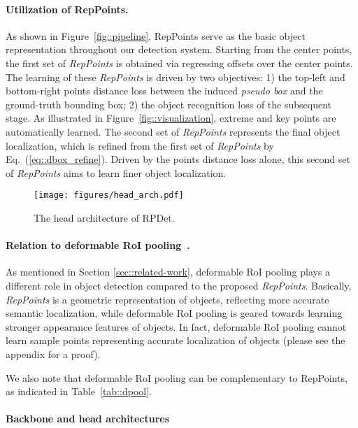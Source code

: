 \documentclass[10pt,twocolumn,letterpaper]{article}
\begin{document}
\paragraph{Utilization of RepPoints.} As shown in Figure~\ref{fig::pipeline}, RepPoints serve as the basic object representation throughout our detection system. Starting from the center points, the first set of \textit{RepPoints} is obtained via regressing offsets over the center points. The learning of these \textit{RepPoints} is driven by two objectives: 1) the top-left and bottom-right points distance loss between the induced \textit{pseudo box} and the ground-truth bounding box; 2) the object recognition loss of the subsequent stage. As illustrated in Figure~\ref{fig::visualization}, extreme and key points are automatically learned. The second set of \emph{RepPoints} represents the final object localization, which is refined from the first set of \emph{RepPoints} by Eq.~(\ref{eq::dbox_refine}). Driven by the points distance loss alone, this second set of \textit{RepPoints} aims to learn finer object localization.

\begin{figure}[tb]
\centering
 \texttt{[image: figures/head\_arch.pdf]}
\caption{The head architecture of RPDet.}
\vspace{-1em}
\label{fig::head_arch}
\end{figure}
 
\vspace{-10pt}
\paragraph{Relation to deformable RoI pooling~\cite{DCN}.} As mentioned in Section \ref{sec::related-work}, deformable RoI pooling plays a different role in object detection compared to the proposed \emph{RepPoints}. Basically, \textit{RepPoints} is a geometric representation of objects, reflecting more accurate semantic localization, while deformable RoI pooling is geared towards learning stronger appearance features of objects. In fact, deformable RoI pooling cannot learn sample points representing accurate localization of objects (please see the appendix for a proof).


We also note that deformable RoI pooling can be complementary to RepPoints, as indicated in Table~\ref{tab::dpool}.

\vspace{-5pt}
\paragraph{Backbone and head architectures}
\end{document}
